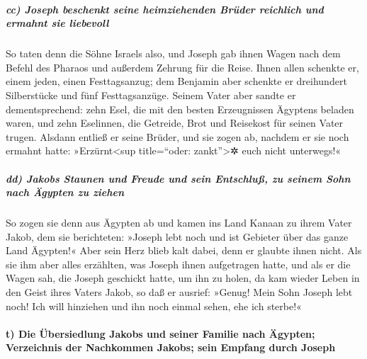 \hypertarget{cc-joseph-beschenkt-seine-heimziehenden-bruxfcder-reichlich-und-ermahnt-sie-liebevoll}{%
\subparagraph{cc) Joseph beschenkt seine heimziehenden Brüder reichlich
und ermahnt sie
liebevoll}\label{cc-joseph-beschenkt-seine-heimziehenden-bruxfcder-reichlich-und-ermahnt-sie-liebevoll}}

 So taten denn die Söhne Israels also, und Joseph gab
ihnen Wagen nach dem Befehl des Pharaos und außerdem Zehrung für die
Reise.  Ihnen allen schenkte er, einem jeden, einen
Festtagsanzug; dem Benjamin aber schenkte er dreihundert Silberstücke
und fünf Festtagsanzüge.  Seinem Vater aber sandte er
dementsprechend: zehn Esel, die mit den besten Erzeugnissen Ägyptens
beladen waren, und zehn Eselinnen, die Getreide, Brot und Reisekost für
seinen Vater trugen.  Alsdann entließ er seine Brüder,
und sie zogen ab, nachdem er sie noch ermahnt hatte:
»Erzürnt\textless sup title=``oder: zankt''\textgreater✲ euch nicht
unterwegs!«

\hypertarget{dd-jakobs-staunen-und-freude-und-sein-entschluuxdf-zu-seinem-sohn-nach-uxe4gypten-zu-ziehen}{%
\subparagraph{dd) Jakobs Staunen und Freude und sein Entschluß, zu
seinem Sohn nach Ägypten zu
ziehen}\label{dd-jakobs-staunen-und-freude-und-sein-entschluuxdf-zu-seinem-sohn-nach-uxe4gypten-zu-ziehen}}

 So zogen sie denn aus Ägypten ab und kamen ins Land
Kanaan zu ihrem Vater Jakob,  dem sie berichteten:
»Joseph lebt noch und ist Gebieter über das ganze Land Ägypten!« Aber
sein Herz blieb kalt dabei, denn er glaubte ihnen nicht. 
Als sie ihm aber alles erzählten, was Joseph ihnen aufgetragen hatte,
und als er die Wagen sah, die Joseph geschickt hatte, um ihn zu holen,
da kam wieder Leben in den Geist ihres Vaters Jakob,  so
daß er ausrief: »Genug! Mein Sohn Joseph lebt noch! Ich will hinziehen
und ihn noch einmal sehen, ehe ich sterbe!«

\hypertarget{t-die-uxfcbersiedlung-jakobs-und-seiner-familie-nach-uxe4gypten-verzeichnis-der-nachkommen-jakobs-sein-empfang-durch-joseph}{%
\paragraph{t) Die Übersiedlung Jakobs und seiner Familie nach Ägypten;
Verzeichnis der Nachkommen Jakobs; sein Empfang durch
Joseph}\label{t-die-uxfcbersiedlung-jakobs-und-seiner-familie-nach-uxe4gypten-verzeichnis-der-nachkommen-jakobs-sein-empfang-durch-joseph}}

